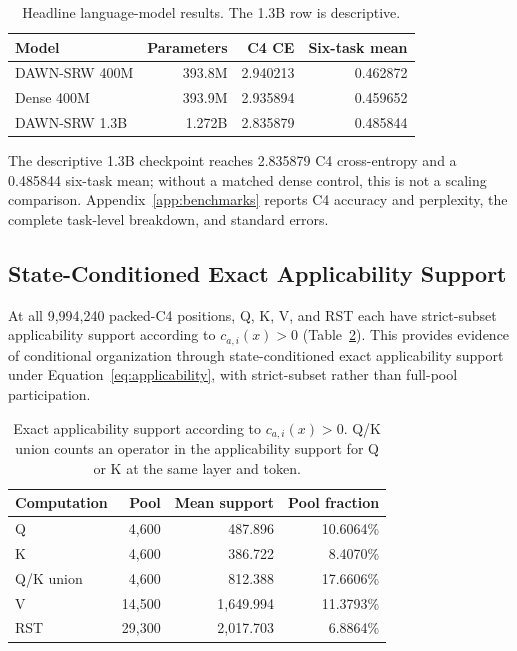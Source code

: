\documentclass{article}
\newcommand{\DAWN}{DAWN-SRW}
\begin{document}
\begin{table}[t]
\centering
\caption{Headline language-model results. The 1.3B row is descriptive.}
\label{tab:headline-performance}
\small
\begin{tabular}{@{}lrrr@{}}
\toprule
Model & Parameters & C4 CE & Six-task mean\\
\midrule
\DAWN{} 400M & 393.8M & 2.940213 & 0.462872\\
Dense 400M & 393.9M & 2.935894 & 0.459652\\
\DAWN{} 1.3B & 1.272B & 2.835879 & 0.485844\\
\bottomrule
\end{tabular}
\end{table}

The descriptive 1.3B checkpoint reaches 2.835879 C4 cross-entropy and a
0.485844 six-task mean; without a matched dense control, this is not a scaling
comparison. Appendix~\ref{app:benchmarks} reports C4 accuracy and perplexity,
the complete task-level breakdown, and standard errors.

\subsection{State-Conditioned Exact Applicability Support}
\label{sec:support}

At all 9,994,240 packed-C4 positions, Q, K, V, and RST each have strict-subset
applicability support according to \(c_{a,i}(x)>0\) (Table~\ref{tab:support}).
This provides evidence of conditional organization through state-conditioned
exact applicability support under Equation~\ref{eq:applicability}, with
strict-subset rather than full-pool participation.

\begin{table}[t]
\centering
\caption{Exact applicability support according to \(c_{a,i}(x)>0\). Q/K union
counts an operator in the applicability support for Q or K at the same layer and
token.}
\label{tab:support}
\small
\begin{tabular}{lrrr}
\toprule
Computation & Pool & Mean support & Pool fraction\\
\midrule
Q & 4,600 & 487.896 & 10.6064\%\\
K & 4,600 & 386.722 & 8.4070\%\\
Q/K union & 4,600 & 812.388 & 17.6606\%\\
V & 14,500 & 1,649.994 & 11.3793\%\\
RST & 29,300 & 2,017.703 & 6.8864\%\\
\bottomrule
\end{tabular}
\end{table}
\end{document}
